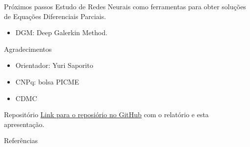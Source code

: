 \documentclass[13pt]{beamer}
\begin{document}

\begin{frame}{Próximos passos}
    Estudo de Redes Neurais como ferramentas para obter soluções de Equações Diferenciais Parciais.
    \begin{itemize}
        \item<2-> DGM: Deep Galerkin Method.
    \end{itemize}
\end{frame}


\begin{frame}{Agradecimentos}
    \begin{itemize}
        \item<1-> Orientador: Yuri Saporito
        \item<2-> CNPq: bolsa PICME
        \item<2-> CDMC
    \end{itemize}
\end{frame}

\begin{frame}{Repositório}
    \href{https://github.com/Caioflp/relatorio-ic}{Link para o reposiório no GitHub} com o relatório e esta apresentação.
\end{frame}


\begin{frame}[allowframebreaks]{Referências}
    \printbibliography[heading=bibintoc, title={Referências}]
\end{frame}
\end{document}
